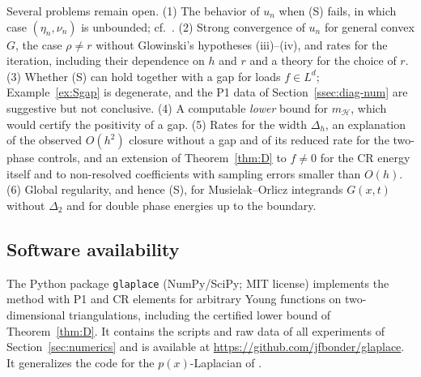 \documentclass[11pt]{amsart}
\theoremstyle{definition}
\theoremstyle{remark}
\numberwithin{equation}{section}
\newcommand{\mH}{m_{\mathcal H}}
\begin{document}
Several problems remain open. (1) The behavior of $u_n$ when (S) fails, in which case $(\eta_n,\nu_n)$ is unbounded; cf.\ \cite[Rem.~23]{GlowinskiPanTai2016}. (2) Strong convergence of $u_n$ for general convex $G$, the case $\rho\ne r$ without Glowinski's hypotheses (iii)--(iv), and rates for the iteration, including their dependence on $h$ and $r$ and a theory for the choice of $r$. (3) Whether (S) can hold together with a gap for loads $f\in L^d$; Example~\ref{ex:Sgap} is degenerate, and the P1 data of Section~\ref{ssec:diag-num} are suggestive but not conclusive. (4) A computable \emph{lower} bound for $\mH$, which would certify the positivity of a gap. (5) Rates for the width $\Delta_h$, an explanation of the observed $O(h^2)$ closure without a gap and of its reduced rate for the two-phase controls, and an extension of Theorem~\ref{thm:D} to $f\neq0$ for the CR energy itself and to non-resolved coefficients with sampling errors smaller than $O(h)$. (6) Global regularity, and hence (S), for Musielak--Orlicz integrands $G(x,t)$ without $\Delta_2$ and for double phase energies up to the boundary.

\subsection*{Software availability}
The Python package \texttt{glaplace} (NumPy/SciPy; MIT license) implements the method with P1 and CR elements for arbitrary Young functions on two-dimensional triangulations, including the certified lower bound of Theorem~\ref{thm:D}. It contains the scripts and raw data of all experiments of Section~\ref{sec:numerics} and is available at \url{https://github.com/jfbonder/glaplace}. It generalizes the code for the $p(x)$-Laplacian of \cite{AragonFBRubio2023}.
\end{document}
